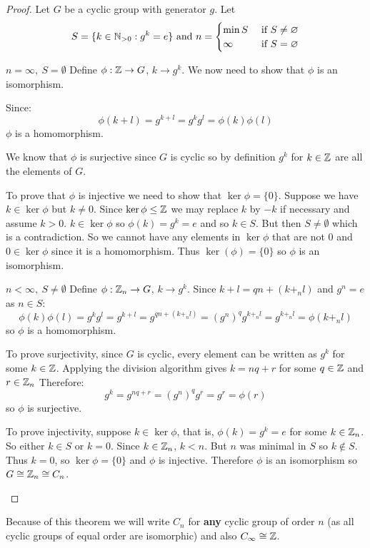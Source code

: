 \documentclass[../main.tex]{subfiles}
\begin{document}
\begin{proof}
  Let $G$ be a cyclic group with generator $g$.
  Let
  \[
    S = \{k \in \mathbb{N}_{>0} : g^{k} = e\}\text{ and }
    n = \begin{cases}
    \min S & \text{ if } S \neq \varnothing \\
    \infty & \text{ if } S = \varnothing
    \end{cases}
  \]
  \begin{proofcases}
    \begin{case}{$n = \infty,\ S = \emptyset$}
      Define $\phi: \mathbb{Z} \to G$, $k \to g^{k}$.
      We now need to show that $\phi$ is an isomorphism.

      Since:
      \[
        \phi(k + l) = g^{k + l} = g^{k}g^{l} = \phi(k)\phi(l)
      \]
      $\phi$ is a homomorphism.

      We know that $\phi$ is surjective since $G$ is cyclic so by definition $g^{k}$ for $k \in \mathbb{Z}$ are all the elements of $G$.

      To prove that $\phi$ is injective we need to show that $\ker \phi = \{0\}$.
      Suppose we have $k \in \ker \phi$ but $k \neq 0$.
      Since $\ker \phi \leq \mathbb{Z}$ we may replace $k$ by $-k$ if necessary and assume $k > 0$.
      $k \in \ker \phi$ so $\phi(k) = g^{k} = e$ and so $k \in S$.
      But then $S \neq \emptyset$ which is a contradiction.
      So we cannot have any elements in $\ker \phi$ that are not 0 and $0 \in \ker \phi$ since it is a homomorphism.
      Thus $\ker(\phi) = \{0\}$ so $\phi$ is an isomorphism.
    \end{case}
    \begin{case}{$n < \infty,\ S \neq \emptyset$}
      Define $\phi: \mathbb{Z}_n \to G$, $k \to g^{k}$.
      Since $k + l = qn + (k +_n l)$ and $g^{n} = e$ as $n \in S$:
      \[
        \phi(k)\phi(l) = g^{k}g^{l} = g^{k + l} = g^{qn + (k +_n l)} = (g^{n})^{q} g^{k +_n l} = g^{k +_n l} = \phi(k +_n l)
      \]
      so $\phi$ is a homomorphism.

      To prove surjectivity, since $G$ is cyclic, every element can be written as $g^{k}$ for some $k \in \mathbb{Z}$.
      Applying the division algorithm gives $k = nq + r$ for some $q \in \mathbb{Z}$ and $r \in \mathbb{Z}_n$
      Therefore:
      \[
        g^{k} = g^{nq + r} = (g^{n})^{q}g^{r} = g^{r} = \phi(r)
      \]
      so $\phi$ is surjective.

      To prove injectivity, suppose $k \in \ker \phi$, that is, $\phi(k) = g^{k} = e$ for some $k \in \mathbb{Z}_n$.
      So either $k \in S$ or $k = 0$.
      Since $k \in \mathbb{Z}_n$, $k < n$.
      But $n$ was minimal in $S$ so $k \notin S$.
      Thus $k = 0$, so $\ker \phi = \{0\}$ and $\phi$ is injective.
      Therefore $\phi$ is an isomorphism so $G \cong \mathbb{Z}_n \cong C_n$.
    \end{case}
  \end{proofcases}
\end{proof}
\begin{remark}[Notation]
  Because of this theorem we will write $C_n$ for \textbf{any} cyclic group of order $n$ (as all cyclic groups of equal order are isomorphic) and also $C_{\infty} \cong \mathbb{Z}$.
\end{remark}
\end{document}
